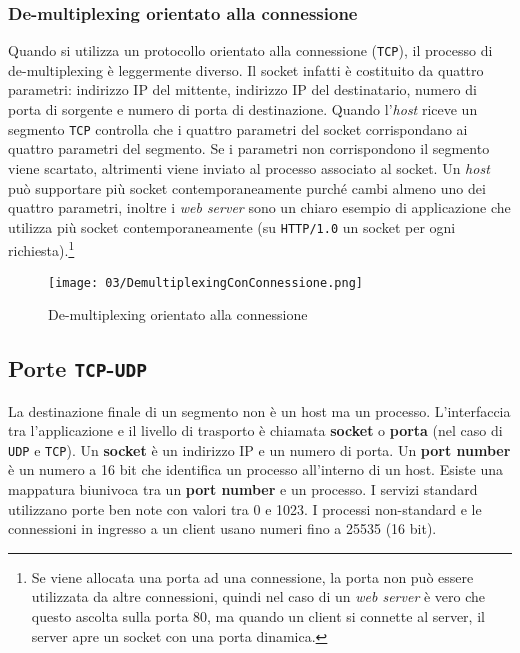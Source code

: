        \subsubsection{De-multiplexing orientato alla connessione}
            Quando si utilizza un protocollo orientato alla connessione (\texttt{TCP}), il processo di de-multiplexing è leggermente diverso. Il socket infatti è costituito da quattro parametri: indirizzo IP del mittente, indirizzo IP del destinatario, numero di porta di sorgente e numero di porta di destinazione. Quando l'\textit{host} riceve un segmento \texttt{TCP} controlla che i quattro parametri del socket corrispondano ai quattro parametri del segmento. Se i parametri non corrispondono il segmento viene scartato, altrimenti viene inviato al processo associato al socket. Un \textit{host} può supportare più socket contemporaneamente purché cambi almeno uno dei quattro parametri, inoltre i \textit{web server} sono un chiaro esempio di applicazione che utilizza più socket contemporaneamente (su \texttt{HTTP/1.0} un socket per ogni richiesta).\footnote{Se viene allocata una porta ad una connessione, la porta non può essere utilizzata da altre connessioni, quindi nel caso di un \textit{web server} è vero che questo ascolta sulla porta 80, ma quando un client si connette al server, il server apre un socket con una porta dinamica.}
            \begin{figure}[H]
                \centering
                \texttt{[image: 03/DemultiplexingConConnessione.png]}
                \caption{De-multiplexing orientato alla connessione}
            \end{figure}
    \subsection{Porte \texttt{TCP}-\texttt{UDP}}
        La destinazione finale di un segmento non è un host ma un processo. L'interfaccia tra l'applicazione e il livello di trasporto è chiamata \textbf{socket} o \textbf{porta} (nel caso di \texttt{UDP} e \texttt{TCP}). Un \textbf{socket} è un indirizzo IP e un numero di porta. Un \textbf{port number} è un numero a 16 bit che identifica un processo all'interno di un host. Esiste una mappatura biunivoca tra un \textbf{port number} e un processo. I servizi standard utilizzano porte ben note con valori tra 0 e 1023. I processi non-standard e le connessioni in ingresso a un client usano numeri fino a 25535 (16 bit).
